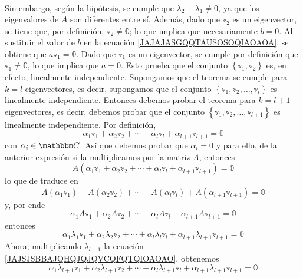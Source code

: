 \begin{theorem}
$${\begin{array}{r}
    \end{array}}$$
    Sin embargo, según la hipótesis, se cumple que $\lambda_2 - \lambda_1 \neq 0$, ya que los eigenvalores de $A$ son diferentes entre sí. Además, dado que $\mathbb{v}_2$ es un eigenvector, se tiene que, por definición, $\mathbb{v}_2 \neq \mathbb{0}$; lo que implica que necesariamente $b = 0$. Al sustituir el valor de $b$ en la ecuación \eqref{JAJAJASGQQTAUSOSOQIAOAOA}, se obtiene que $a\mathbb{v}_1 = \mathbb{0}$. Dado que $\mathbb{v}_1$ es un eigenvector, se cumple por definición que $\mathbb{v}_1 \neq \mathbb{0}$, lo que implica que $a = 0$. Esto prueba que el conjunto $\left\{ \mathbb{v}_1, \mathbb{v}_2 \right\}$ es, en efecto, linealmente independiente. Supongamos que el teorema se cumple para $k = l$ eigenvectores, es decir, supongamos que el conjunto $\left\{ \mathbb{v}_1, \mathbb{v}_2, \dots, \mathbb{v}_l \right\}$ es linealmente independiente. Entonces debemos probar el teorema para $k = l + 1$ eigenvectores, es decir, debemos probar que el conjunto $\left\{ \mathbb{v}_1, \mathbb{v}_2, \dots, \mathbb{v}_{l + 1} \right\}$ es linealmente independiente. Por definición,
    \begin{equation}
        \alpha_1 \mathbb{v}_1 + \alpha_2 \mathbb{v}_2 + \cdots + \alpha_{l} \mathbb{v}_{l} + \alpha_{l + 1} \mathbb{v}_{l + 1} = \mathbb{0} \label{JAJSJSBBAJQHQJQJQVCQFQTQIOAOAO}
    \end{equation}
    con $\alpha_i \in \CC$. Así que debemos probar que $\alpha_i = 0$ y para ello, de la anterior expresión si la multiplicamos por la matriz $A$, entonces
    $$A \left( \alpha_1 \mathbb{v}_1 + \alpha_2 \mathbb{v}_2 + \cdots + \alpha_{l} \mathbb{v}_{l} + \alpha_{l + 1} \mathbb{v}_{l + 1} \right) = \mathbb{0}$$
    lo que de traduce en
    $$A(\alpha_1\mathbb{v}_1) + A(\alpha_2\mathbb{v}_2) + \cdots + A(\alpha_l\mathbb{v}_l)+ A(\alpha_{l+1}\mathbb{v}_{l+1}) = \mathbb{0}$$
    y, por ende
    $$\alpha_1A\mathbb{v}_1 + \alpha_2A\mathbb{v}_2 + \cdots + \alpha_lA\mathbb{v}_l + \alpha_{l+1}A\mathbb{v}_{l+1} = \mathbb{0}$$
    entonces
    \begin{equation}
        \alpha_1\lambda_1\mathbb{v}_1 + \alpha_2\lambda_2\mathbb{v}_2 + \cdots + \alpha_l\lambda_l\mathbb{v}_l + \alpha_{l+1}\lambda_{l+1}\mathbb{v}_{l+1} = \mathbb{0} \label{IAJQUUQJQVQHQHAHHAHAHAVACACAVA}
    \end{equation}
    Ahora, multiplicando $\lambda_{l+1}$ la ecuación \eqref{JAJSJSBBAJQHQJQJQVCQFQTQIOAOAO}, obtenemos
    \begin{equation}
        \alpha_1\lambda_{l+1}\mathbb{v}_1 + \alpha_2\lambda_{l+1}\mathbb{v}_2 + \cdots + \alpha_l\lambda_{l+1}\mathbb{v}_l + \alpha_{l+1}\lambda_{l+1}\mathbb{v}_{l+1} = \mathbb{0} \label{AAOSIKQKWJWHGWHWVSVS}

\end{equation}
\end{theorem}

